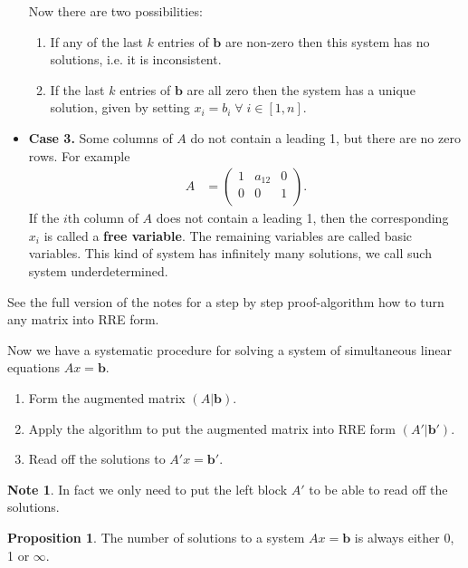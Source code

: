 \documentclass[11pt,a4paper]{article}
\theoremstyle{definition}
\newtheorem{note}{Note}
\newtheorem{proposition}{Proposition}
\begin{document}
\begin{itemize}
    Now there are two possibilities:
    \begin{enumerate}
        \item If any of the last $k$ entries of $\mathbf{b}$ are non-zero then this system has no solutions, i.e. it is inconsistent.
        \item If the last $k$ entries of $\mathbf{b}$ are all zero then the system has a unique solution, given by setting $ x_i = b_i \;\forall \; i \in [1, n] $.
    \end{enumerate}
    \item \textbf{Case 3.} Some columns of $A$ do not contain a leading 1, but there are no zero rows. For example
    \begin{align}
        A &= \begin{pmatrix}
            1 & a_{12} & 0 \\
            0 & 0 & 1 \\
        \end{pmatrix}.
    \end{align}
    If the $i$th column of $A$ does not contain a leading 1, then the corresponding $x_i$ is called a \textbf{free variable}. 
    The remaining variables are called basic variables. This kind of system has infinitely many solutions, we call such system underdetermined.
\end{itemize}

See the full version of the notes for a step by step proof-algorithm how to turn any matrix into RRE form.

Now we have a systematic procedure for solving a system of simultaneous linear equations $Ax = \mathbf{b}$.
\begin{enumerate}
    \item Form the augmented matrix $(A|\mathbf{b})$.
    \item Apply the algorithm to put the augmented matrix into RRE form $(A'|\mathbf{b}')$.
    \item Read off the solutions to $A'x = \mathbf{b}'$.
\end{enumerate}
\begin{note}
    In fact we only need to put the left block $A'$ to be able to read off the solutions.
\end{note}

\begin{proposition}
    The number of solutions to a system $Ax = \mathbf{b}$ is always either 0, 1 or $\infty$. 
\end{proposition}
\end{document}
